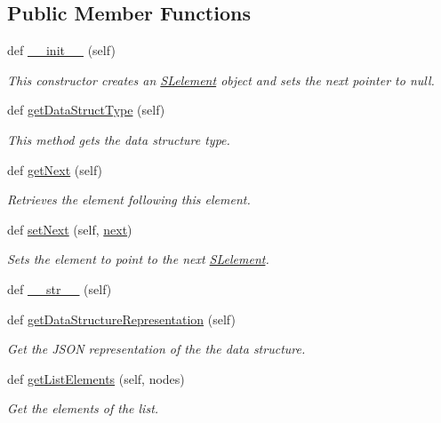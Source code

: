 \subsection*{Public Member Functions}
\begin{DoxyCompactItemize}
\item 
def \hyperlink{class_s_lelement_1_1_s_lelement_ae26eaba46cd18873ff98829d5219e326}{\+\_\+\+\_\+init\+\_\+\+\_\+} (self)
\begin{DoxyCompactList}\small\item\em This constructor creates an \hyperlink{class_s_lelement_1_1_s_lelement}{S\+Lelement} object and sets the next pointer to null. \end{DoxyCompactList}\item 
def \hyperlink{class_s_lelement_1_1_s_lelement_a690bf89d74bf33c3f1e612fb755bc4b5}{get\+Data\+Struct\+Type} (self)
\begin{DoxyCompactList}\small\item\em This method gets the data structure type. \end{DoxyCompactList}\item 
def \hyperlink{class_s_lelement_1_1_s_lelement_a7fccca213f1f7c743ee91b296d47d748}{get\+Next} (self)
\begin{DoxyCompactList}\small\item\em Retrieves the element following this element. \end{DoxyCompactList}\item 
def \hyperlink{class_s_lelement_1_1_s_lelement_a7afcfe543e4e652c9f28a3d97c8b04bf}{set\+Next} (self, \hyperlink{class_s_lelement_1_1_s_lelement_a2d83afedba3b70183c90c3454ac99a29}{next})
\begin{DoxyCompactList}\small\item\em Sets the element to point to the next \hyperlink{class_s_lelement_1_1_s_lelement}{S\+Lelement}. \end{DoxyCompactList}\item 
def \hyperlink{class_s_lelement_1_1_s_lelement_ac33402fd5847218346937547e451f52d}{\+\_\+\+\_\+str\+\_\+\+\_\+} (self)
\item 
def \hyperlink{class_s_lelement_1_1_s_lelement_a16059f50cdc8f93201984418042b70b5}{get\+Data\+Structure\+Representation} (self)
\begin{DoxyCompactList}\small\item\em Get the J\+S\+ON representation of the the data structure. \end{DoxyCompactList}\item 
def \hyperlink{class_s_lelement_1_1_s_lelement_ac9d7ae06a680c795138ee3eff910b25f}{get\+List\+Elements} (self, nodes)
\begin{DoxyCompactList}\small\item\em Get the elements of the list. \end{DoxyCompactList}\end{DoxyCompactItemize}

